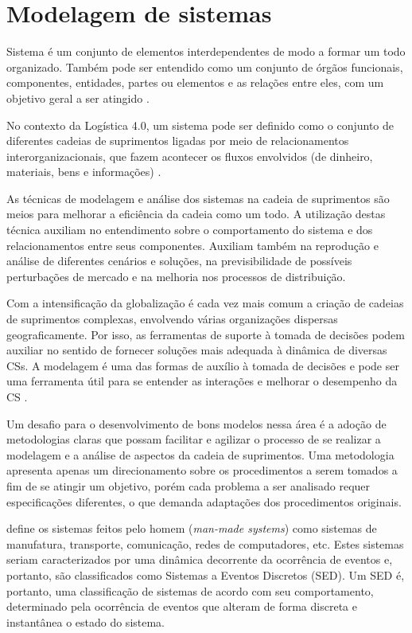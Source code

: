 \section{Modelagem de sistemas}
\label{sec:modelagem}

Sistema é um conjunto de elementos interdependentes de modo a formar um todo organizado. Também pode ser entendido como um conjunto de órgãos funcionais, componentes, entidades, partes ou elementos e as relações entre eles, com um objetivo geral a ser atingido \cite{mulbert2005sistemas}.

No contexto da Logística 4.0, um sistema pode ser definido como o conjunto de diferentes cadeias de suprimentos ligadas por meio de relacionamentos interorganizacionais, que fazem acontecer os fluxos envolvidos (de dinheiro, materiais, bens e informações) \cite{oliveira2016supplychain}.

As técnicas de modelagem e análise dos sistemas na cadeia de suprimentos são meios para melhorar a eficiência da cadeia como um todo. A utilização destas técnica auxiliam no entendimento sobre o comportamento do sistema e dos relacionamentos entre seus componentes. Auxiliam também na reprodução e análise de diferentes cenários e soluções, na previsibilidade de possíveis perturbações de mercado e na melhoria nos processos de distribuição.

Com a intensificação da globalização é cada vez mais comum a criação de cadeias de suprimentos complexas, envolvendo várias organizações dispersas geograficamente. Por isso, as ferramentas de suporte à tomada de decisões podem auxiliar no sentido de fornecer soluções mais adequada à dinâmica de diversas CSs. A modelagem é uma das formas de auxílio à tomada de decisões e pode ser uma ferramenta útil para se entender as interações e melhorar o desempenho da CS \cite{oliveira2016supplychain}.

Um desafio para o desenvolvimento de bons modelos nessa área é a adoção de metodologias claras que possam facilitar e agilizar o processo de se realizar a modelagem e a análise de aspectos da cadeia de suprimentos. Uma metodologia apresenta apenas um direcionamento sobre os procedimentos a serem tomados a fim de se atingir um objetivo, porém cada problema a ser analisado requer especificações diferentes, o que demanda adaptações dos procedimentos originais.

 define os sistemas feitos pelo homem (\textit{man-made systems}) como sistemas de manufatura, transporte, comunicação, redes de computadores, etc. Estes sistemas seriam caracterizados por uma dinâmica decorrente da ocorrência de eventos e, portanto, são classificados como Sistemas a Eventos Discretos (SED). Um SED é, portanto, uma classificação de sistemas de acordo com seu comportamento, determinado pela ocorrência de eventos que alteram de forma discreta e instantânea o estado do sistema.

